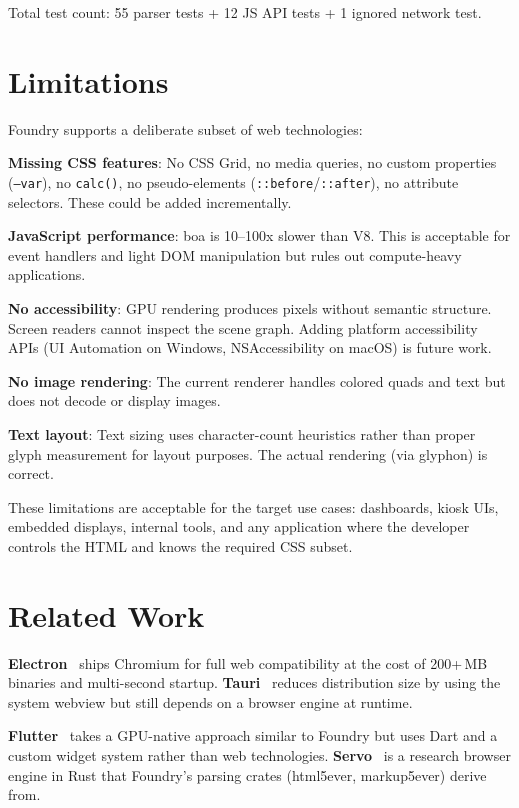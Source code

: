 \documentclass[11pt,twocolumn]{article}
\begin{document}
Total test count: 55 parser tests + 12 JS API tests + 1 ignored network test.

\section{Limitations}

Foundry supports a deliberate subset of web technologies:

\textbf{Missing CSS features}: No CSS Grid, no media queries, no custom properties (\texttt{--var}), no \texttt{calc()}, no pseudo-elements (\texttt{::before}/\texttt{::after}), no attribute selectors. These could be added incrementally.

\textbf{JavaScript performance}: boa is 10--100x slower than V8. This is acceptable for event handlers and light DOM manipulation but rules out compute-heavy applications.

\textbf{No accessibility}: GPU rendering produces pixels without semantic structure. Screen readers cannot inspect the scene graph. Adding platform accessibility APIs (UI Automation on Windows, NSAccessibility on macOS) is future work.

\textbf{No image rendering}: The current renderer handles colored quads and text but does not decode or display images.

\textbf{Text layout}: Text sizing uses character-count heuristics rather than proper glyph measurement for layout purposes. The actual rendering (via glyphon) is correct.

These limitations are acceptable for the target use cases: dashboards, kiosk UIs, embedded displays, internal tools, and any application where the developer controls the HTML and knows the required CSS subset.

\section{Related Work}

\textbf{Electron}~\cite{electron} ships Chromium for full web compatibility at the cost of 200+\,MB binaries and multi-second startup. \textbf{Tauri}~\cite{tauri} reduces distribution size by using the system webview but still depends on a browser engine at runtime.

\textbf{Flutter}~\cite{flutter} takes a GPU-native approach similar to Foundry but uses Dart and a custom widget system rather than web technologies. \textbf{Servo}~\cite{servo} is a research browser engine in Rust that Foundry's parsing crates (html5ever, markup5ever) derive from.
\end{document}
